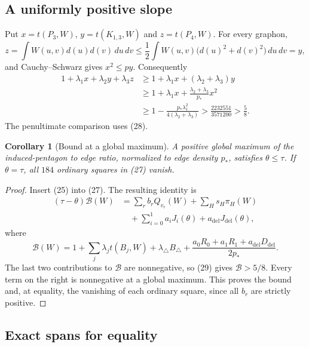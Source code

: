 \documentclass[11pt]{amsart}
\newtheorem{corollary}[theorem]{Corollary}
\theoremstyle{definition}
\theoremstyle{remark}
\begin{document}
\subsection{A uniformly positive slope}

Put \(x=t(P_3,W)\), \(y=t(K_{1,3},W)\) and \(z=t(P_4,W)\).
For every graphon,
\[
 z=\int W(u,v)d(u)d(v)\,du\,dv
 \le\frac12\int W(u,v)\bigl(d(u)^2+d(v)^2\bigr)\,du\,dv=y,
\]
and Cauchy--Schwarz gives \(x^2\le py\). Consequently
\begin{equation}
 \begin{aligned}
 1+\lambda_1x+\lambda_2y+\lambda_3z
 &\ge1+\lambda_1x+(\lambda_2+\lambda_3)y\\
 &\ge1+\lambda_1x+\frac{\lambda_2+\lambda_3}{p_*}x^2\\
 &\ge1-\frac{p_*\lambda_1^2}{4(\lambda_2+\lambda_3)}
 >\frac{2232551}{3571200}>\frac58.
 \end{aligned}\tag{29}
\end{equation}
The penultimate comparison uses (28).

\begin{corollary}[Bound at a global maximum]\label{cor:certificate-bound}
A positive global maximum of the induced-pentagon to edge ratio,
normalized to edge density \(p_*\), satisfies \(\theta\le\tau\).
If \(\theta=\tau\), all \(184\) ordinary squares in (27) vanish.
\end{corollary}
\begin{proof}
Insert (25) into (27). The resulting identity is
\[
 \begin{aligned}
 (\tau-\theta)\mathcal B(W)
 &=\sum_rb_rQ_{v_r}(W)+\sum_Hs_H\pi_H(W)\\
 &\quad+\sum_{i=0}^1a_iJ_i(\theta)
              +a_{\mathrm{del}}J_{\mathrm{del}}(\theta),
 \end{aligned}
\]
where
\[
 \mathcal B(W)=1+\sum_j\lambda_jt(B_j,W)
       +\lambda_\triangle B_\triangle
       +\frac{a_0R_0+a_1R_1+a_{\mathrm{del}}D_{\mathrm{del}}}{2p_*}.
\]
The last two contributions to \(\mathcal B\) are nonnegative, so (29)
gives \(\mathcal B>5/8\). Every term on the right is nonnegative at a
global maximum. This proves the bound and, at equality, the vanishing
of each ordinary square, since all \(b_r\) are strictly positive.
\end{proof}

\subsection{Exact spans for equality}
\end{document}
